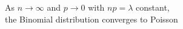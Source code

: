 \documentclass[preview]{standalone}
\begin{document}
\begin{center}
As $n \to \infty$ and $p \to 0$ with $np = \lambda$ constant,\\the Binomial distribution converges to Poisson
\end{center}
\end{document}
